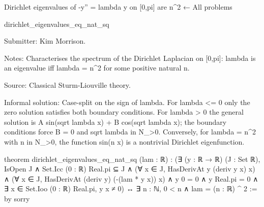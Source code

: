 Dirichlet eigenvalues of -y'' = lambda y on [0,pi] are n^2
← All problems

dirichlet_eigenvalues_eq_nat_sq

Submitter: Kim Morrison.

Notes: Characterises the spectrum of the Dirichlet Laplacian on [0,pi]: lambda is an eigenvalue iff lambda = n^2 for some positive natural n.

Source: Classical Sturm-Liouville theory.

Informal solution: Case-split on the sign of lambda. For lambda <= 0 only the zero solution satisfies both boundary conditions. For lambda > 0 the general solution is A sin(sqrt lambda x) + B cos(sqrt lambda x); the boundary conditions force B = 0 and sqrt lambda in N_{>0}. Conversely, for lambda = n^2 with n in N_{>0}, the function sin(n x) is a nontrivial Dirichlet eigenfunction.

theorem dirichlet_eigenvalues_eq_nat_sq (lam : ℝ) :
    (∃ (y : ℝ → ℝ) (J : Set ℝ),
        IsOpen J ∧ Set.Icc (0 : ℝ) Real.pi ⊆ J ∧
        (∀ x ∈ J, HasDerivAt y (deriv y x) x) ∧
        (∀ x ∈ J, HasDerivAt (deriv y) (-(lam * y x)) x) ∧
        y 0 = 0 ∧ y Real.pi = 0 ∧
        ∃ x ∈ Set.Ioo (0 : ℝ) Real.pi, y x ≠ 0) ↔
      ∃ n : ℕ, 0 < n ∧ lam = (n : ℝ) ^ 2 := by
  sorry